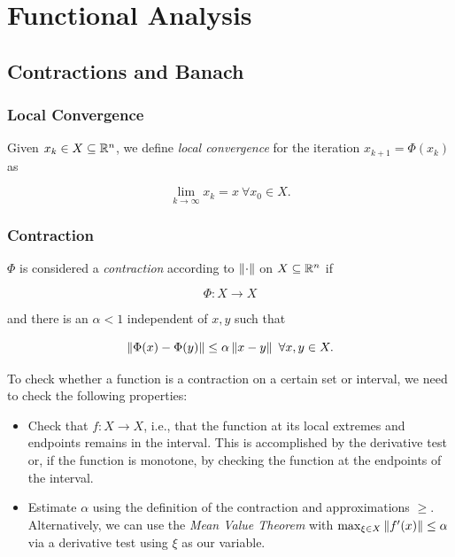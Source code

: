 \chapter{Functional Analysis}

\section{Contractions and Banach}

\subsection{Local Convergence}

Given \(x_k \in X \subseteq \mathbb{R}^n\), we define \emph{local convergence} for the iteration \(x_{k + 1} = \Phi(x_k)\) as 

\[
    \lim_{k \to \infty} x_k = x \ \forall x_0 \in X.
\]

\subsection{Contraction}

\(\Phi\) is considered a \emph{contraction} according to \(\left\| \cdot \right\|\) on \(X \subseteq \mathbb{R}^n\) if 

\[
    \Phi: X \to X
\]

and there is an \(\alpha < 1\) independent of \(x,y\) such that 

\[
    \left\| \Phi(x) - \Phi(y) \right\| \le \alpha \left\| x - y \right\| \ \forall x,y \in X.
\]

To check whether a function is a contraction on a certain set or interval, we need to check the following properties:

\begin{itemize}

    \item Check that \(f:X \to X\), i.e., that the function at its local extremes and endpoints remains in the interval. This is 
    accomplished by the derivative test or, if the function is monotone, by checking the function at the endpoints of the interval.

    \item Estimate \(\alpha\) using the definition of the contraction and approximations \(\ge\). Alternatively, we can use the \emph{Mean Value Theorem} with 
    \(\max_{\xi \in X} \left\| f'(x) \right\| \le \alpha\) via a derivative test using \(\xi\) as our variable.

\end{itemize}

